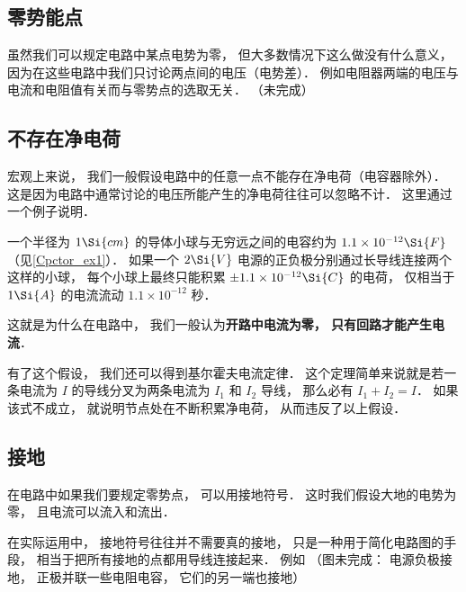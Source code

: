 

\subsection{零势能点}
虽然我们可以规定电路中某点电势为零， 但大多数情况下这么做没有什么意义， 因为在这些电路中我们只讨论两点间的电压（电势差）． 例如电阻器两端的电压与电流和电阻值有关而与零势点的选取无关．
（未完成）

\subsection{不存在净电荷}
宏观上来说， 我们一般假设电路中的任意一点不能存在净电荷（电容器除外）． 这是因为电路中通常讨论的电压所能产生的净电荷往往可以忽略不计． 这里通过一个例子说明．

\begin{example}{}
一个半径为 $1\Si{cm}$ 的导体小球与无穷远之间的电容约为 $1.1\times 10^{-12} \Si{F}$（见\autoref{Cpctor_ex1}）． 如果一个 $2\Si{V}$ 电源的正负极分别通过长导线连接两个这样的小球， 每个小球上最终只能积累 $\pm 1.1\times 10^{-12} \Si{C}$ 的电荷， 仅相当于 $1\Si{A}$ 的电流流动 $1.1\times 10^{-12}$ 秒．
\end{example}
这就是为什么在电路中， 我们一般认为\textbf{开路中电流为零， 只有回路才能产生电流}．

有了这个假设， 我们还可以得到基尔霍夫电流定律． 这个定理简单来说就是若一条电流为 $I$ 的导线分叉为两条电流为 $I_1$ 和 $I_2$ 导线， 那么必有 $I_1 + I_2 = I$． 如果该式不成立， 就说明节点处在不断积累净电荷， 从而违反了以上假设．

\subsection{接地}
在电路中如果我们要规定零势点， 可以用接地符号． 这时我们假设大地的电势为零， 且电流可以流入和流出．

在实际运用中， 接地符号往往并不需要真的接地， 只是一种用于简化电路图的手段， 相当于把所有接地的点都用导线连接起来． 例如
（图未完成： 电源负极接地， 正极并联一些电阻电容， 它们的另一端也接地）
